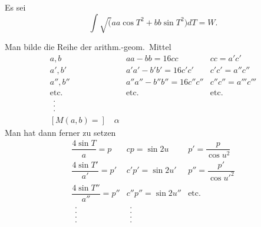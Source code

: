 \par\indent Es sei
\[\int\surd(aa\cos T^2+bb\sin T^2)dT=W.\]
\par\indent Man bilde die Reihe der arithm.-geom.\ Mittel
\[\begin{array}{r|ll}
a,b&aa-bb=16cc&cc=a'c'\\[.4em]
a',b'&a'a'-b'b'=16c'c'&c'c'=a''c''\\[.4em]
a'',b''&a''a''-b''b''=16c''c''&c''c''=a'''c'''\\[.4em]
\text{etc.}&\text{etc.}&\text{etc.}\\[-.4em]
\begin{array}{c}.\\[-.8em].\\[-.8em].\end{array}&&\\
{}[M(a,b)=]\quad\alpha&&
\end{array}\]
\noindent Man hat dann ferner zu setzen
\[\begin{array}{lll}
\dfrac{4\sin T}a=p&cp=\sin2u&p'=\dfrac p{\cos u^2}\\[.8em]
\dfrac{4\sin T'}{a'}=p'&c'p'=\sin2u'&p''=\dfrac{p'}{\cos{u'}^2}\\[.8em]
\dfrac{4\sin T''}{a''}=p''&c''p''=\sin2u''&\text{etc.}\\
\begin{array}{c}.\\[-.8em].\\[-.8em].\\[-.8em].\end{array}&\begin{array}{c}.\\[-.8em].\\[-.8em].\\[-.8em].\end{array}&
\end{array}\]
\clearpage\endgroup
